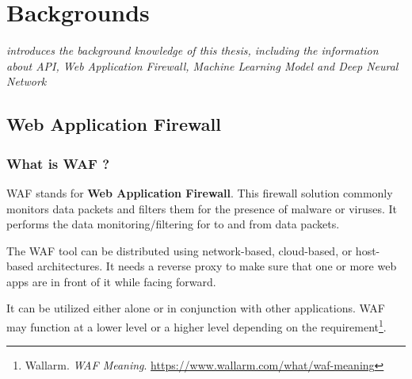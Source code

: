 \chapter{Backgrounds}
\label{chap:backgrounds}
	\textit{introduces the background knowledge of this thesis, including the information about API, Web Application Firewall, Machine Learning Model and Deep Neural Network}
\minitoc

\section{Web Application Firewall} 
\label{sec:waf}
	
\subsection{What is WAF ?}
\label{subsec:waf_def}
WAF stands for \textbf{Web Application Firewall}. This firewall solution commonly monitors data packets and filters them for the presence of malware or viruses. It performs the data monitoring/filtering for to and from data packets.  

The WAF tool can be distributed using network-based, cloud-based, or host-based architectures. It needs a reverse proxy to make sure that one or more web apps are in front of it while facing forward. 

It can be utilized either alone or in conjunction with other applications. WAF may function at a lower level or a higher level depending on the requirement\footnote{Wallarm. \textit{WAF Meaning}. \url{https://www.wallarm.com/what/waf-meaning}}.


